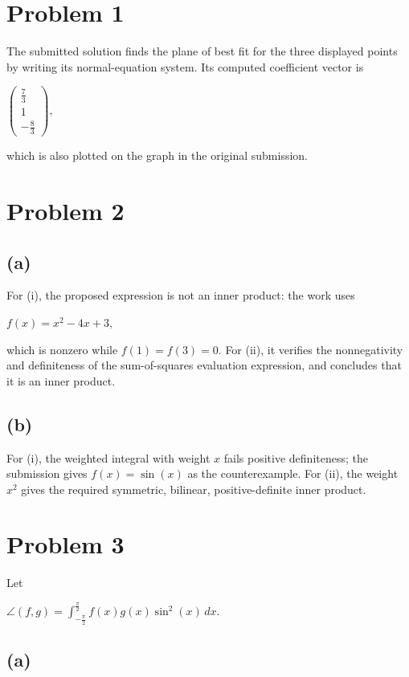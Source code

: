 \section{Problem 1}

The submitted solution finds the plane of best fit for the three displayed points by writing its normal-equation system. Its computed coefficient vector is

\(\begin{pmatrix}
\frac{7}{3} \\
1 \\
{- \frac{8}{3}}
\end{pmatrix},\)

which is also plotted on the graph in the original submission.

\section{Problem 2}

\subsection{(a)}

For (i), the proposed expression is not an inner product: the work uses

\(f(x) = x^{2} - 4x + 3,\)

which is nonzero while \(f(1) = f(3) = 0\). For (ii), it verifies the nonnegativity and definiteness of the sum-of-squares evaluation expression, and concludes that it is an inner product.

\subsection{(b)}

For (i), the weighted integral with weight \(x\) fails positive definiteness; the submission gives \(f(x) = \sin(x)\) as the counterexample. For (ii), the weight \(x^{2}\) gives the required symmetric, bilinear, positive-definite inner product.

\section{Problem 3}

Let

\(\angle\left( {f,g} \right) = \int_{- \frac{\pi}{2}}^{\frac{\pi}{2}}f(x)g(x)\sin^{2}(x)\, dx.\)

\subsection{(a)}

